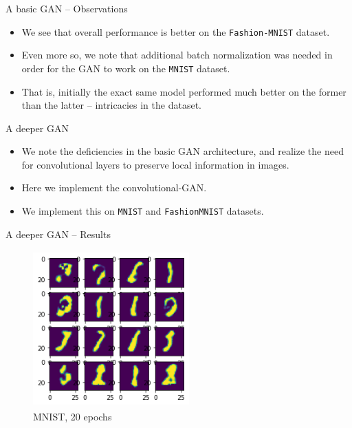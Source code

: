 \documentclass[handout]{beamer}
\begin{document}
\begin{frame}{A basic GAN -- Observations}
    \begin{itemize}
        \item We see that overall performance is better on the \texttt{Fashion-MNIST} dataset.\pause
        \item Even more so, we note that additional batch normalization was needed in order for the GAN to work on the \texttt{MNIST} dataset. \pause
        \item That is, initially the exact same model performed much better on the former than the latter -- intricacies in the dataset.\pause
    \end{itemize}
\end{frame}
\begin{frame}{A deeper GAN}
\begin{itemize}

    \item We note the deficiencies in the basic GAN architecture, and realize the need for convolutional layers to preserve local information in images.\pause
    \item Here we implement the convolutional-GAN.
    \item We implement this on \texttt{MNIST} and \texttt{FashionMNIST} datasets.\pause
    \end{itemize}
\end{frame}
\begin{frame}{A deeper GAN -- Results}
    \begin{figure}[H]
        \centering
        \includegraphics[height = 6cm, width = 6cm]{convGAN_MNIST_20epoc.png}
        \caption{MNIST, 20 epochs}
        \label{fig:my_label}
    \end{figure}
\end{frame}
\end{document}
